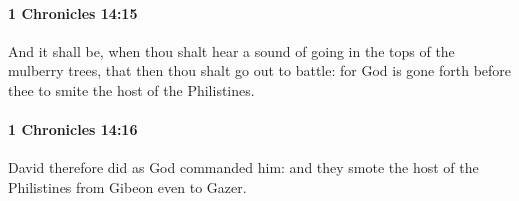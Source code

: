 		\paragraph{1 Chronicles 14:15} %
			\label{1CHRONICLES-14-15}

			And it shall be, when thou shalt hear a sound of going in the tops of the mulberry trees, that then thou shalt go out to battle: for God is gone forth before thee to smite the host of the Philistines.


		\paragraph{1 Chronicles 14:16} %
			\label{1CHRONICLES-14-16}

			David therefore did as God commanded him: and they smote the host of the Philistines from Gibeon even to Gazer.


